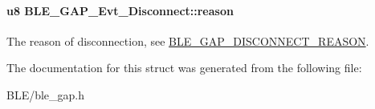 \paragraph[{\texorpdfstring{reason}{reason}}]{\setlength{\rightskip}{0pt plus 5cm}u8 B\+L\+E\+\_\+\+G\+A\+P\+\_\+\+Evt\+\_\+\+Disconnect\+::reason}\hypertarget{struct_b_l_e___g_a_p___evt___disconnect_ad91e51c7ffd5650eab9886f1d8d96348}{}\label{struct_b_l_e___g_a_p___evt___disconnect_ad91e51c7ffd5650eab9886f1d8d96348}
The reason of disconnection, see \hyperlink{group___b_l_e___g_a_p___d_i_s_c_o_n_n_e_c_t___r_e_a_s_o_n}{B\+L\+E\+\_\+\+G\+A\+P\+\_\+\+D\+I\+S\+C\+O\+N\+N\+E\+C\+T\+\_\+\+R\+E\+A\+S\+ON}. 

The documentation for this struct was generated from the following file\+:\begin{DoxyCompactItemize}
\item 
B\+L\+E/ble\+\_\+gap.\+h\end{DoxyCompactItemize}

